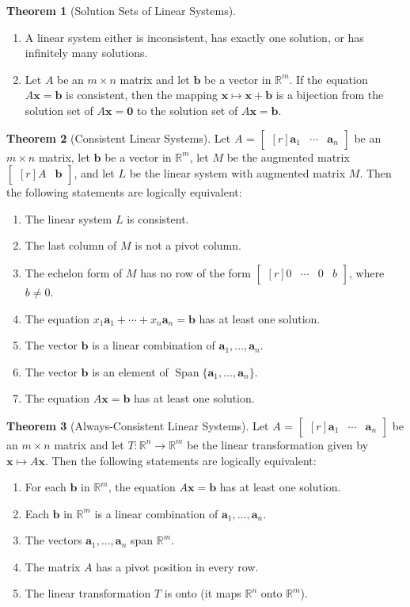 \documentclass{myart}
\renewcommand{\vec}[1]{\ensuremath{\mathbf{#1}}}
\newcommand{\mat}[1]{\ensuremath{#1}}
\newcommand{\R}[1][]{\ensuremath{\mathbb{R}^{#1}}}
\newcommand{\by}{\ensuremath{\times}}
\newcommand{\MAT}[2][r]{\ensuremath{\begin{bmatrix*}[#1]#2\end{bmatrix*}}}
\DeclareMathOperator{\OpSpan}{Span}
\newcommand{\Span}[1]{\ensuremath{\OpSpan\{#1\}}}
\newcommand{\many}[2][n]{\ensuremath{{#2}_1, \ldots, {#2}_{#1}}}
\theoremstyle{definition}
\newtheorem{thm}{Theorem}
\begin{document}
\begin{thm}[Solution Sets of Linear Systems] \hfill
  \begin{enumerate}
  \item A linear system either is inconsistent, has exactly one
    solution, or has infinitely many solutions.
  \item Let \mat A be an $m \by n$ matrix and let \vec b be a vector
    in \R[m]. If the equation $\mat A\vec x = \vec b$ is consistent,
    then the mapping $\vec x \mapsto \vec x + \vec b$ is a bijection
    from the solution set of $\mat A\vec x = \vec 0$ to the solution
    set of $\mat A\vec x = \vec b$.
  \end{enumerate}
\end{thm}

\begin{thm}[Consistent Linear Systems]
  Let \mat A = \MAT{\vec a_1 & \cdots & \vec a_n} be an $m \by n$
  matrix, let \vec b be a vector in \R[m], let $M$ be the augmented
  matrix \MAT{\mat A & \vec b}, and let $L$ be the linear system with
  augmented matrix $M$. Then the following statements are logically
  equivalent:
  \begin{enumerate}
  \item The linear system $L$ is consistent.
  \item The last column of $M$ is not a pivot column.
  \item The echelon form of $M$ has no row of the form \MAT{0 & \cdots
      & 0 & b}, where $b \neq 0$.
  \item The equation $x_1\vec a_1 + \cdots + x_n\vec a_n = \vec b$ has
    at least one solution.
  \item The vector \vec b is a linear combination of \many{\vec a}.
  \item The vector \vec b is an element of \Span{\many{\vec a}}.
  \item The equation $\mat A\vec x = \vec b$ has at least one
    solution.
  \end{enumerate}
\end{thm}

\begin{thm}[Always-Consistent Linear Systems]
  Let \mat A = \MAT{\vec a_1 & \cdots & \vec a_n} be an $m \by n$
  matrix and let $T : \R[n] \to \R[m]$ be the linear transformation
  given by $\vec x \mapsto \mat A\vec x$. Then the following
  statements are logically equivalent:
  \begin{enumerate}
  \item For each \vec b in \R[m], the equation $\mat A\vec x = \vec b$
    has at least one solution.
  \item Each \vec b in \R[m] is a linear combination of \many{\vec a}.
  \item The vectors \many{\vec a} span \R[m].
  \item The matrix \mat A has a pivot position in every row.
  \item The linear transformation $T$ is onto (it maps \R[n] onto
    \R[m]).
  \end{enumerate}
\end{thm}
\end{document}
